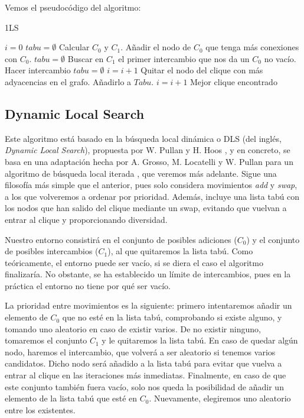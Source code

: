 Vemos el pseudocódigo del algoritmo:

\begin{algorithm}[H]
\caption{1LS}
  \begin{algorithmic}
    \State $i = 0$
    \State $tabu = \emptyset$
    \State Calcular $C_0$ y $C_1$.
    \Repeat
        \State Añadir el nodo de $C_0$ que tenga más conexiones con $C_0$.
        \State $tabu = \emptyset$
      \Else
        \State Buscar en $C_1$ el primer intercambio que nos da un $C_0$ no vacío.
          \State Hacer intercambio
          \State $tabu = \emptyset$
          \State $i = i + 1$
        \Else
          \State Quitar el nodo del clique con más adyacencias en el grafo.
          \State Añadirlo a $Tabu$.
          \State $i = i + 1$
        \EndIf
      \EndIf
    \Return Mejor clique encontrado
    \EndFunction
  \end{algorithmic}
\end{algorithm}

\subsection{Dynamic Local Search}\label{dls}

Este algoritmo está basado en la búsqueda local dinámica o DLS (del inglés, \textit{Dynamic Local Search}),
propuesta por W. Pullan y H. Hoos \citep{pullan:2006}, y en concreto, se basa en una adaptación hecha
por A. Grosso, M. Locatelli y W. Pullan para un algoritmo de búsqueda local iterada \citep{grosso:2008},
que veremos más adelante. Sigue una filosofía más simple que el anterior, pues solo considera movimientos
\textit{add} y \textit{swap}, a los que volveremos a ordenar por prioridad. Además, incluye una
lista tabú con los nodos que han salido del clique mediante un swap, evitando que vuelvan a entrar
al clique y proporcionando diversidad.

Nuestro entorno consistirá en el conjunto de posibles adiciones ($C_0$) y el conjunto de
posibles intercambios ($C_1$), al que quitaremos la lista tabú. Como teóricamente, el entorno
puede ser vacío, si se diera el caso el algoritmo finalizaría. No obstante, se ha establecido
un límite de intercambios, pues en la práctica el entorno no tiene por qué ser vacío.

La prioridad entre movimientos es la siguiente: primero intentaremos añadir un elemento de
$C_0$ que no esté en la lista tabú, comprobando si existe alguno, y tomando uno aleatorio
en caso de existir varios. De no existir ninguno, tomaremos el conjunto $C_1$ y le quitaremos
la lista tabú. En caso de quedar algún nodo, haremos el intercambio, que volverá a ser aleatorio
si tenemos varios candidatos. Dicho nodo será añadido a la lista tabú para evitar que vuelva
a entrar al clique en las iteraciones más inmediatas. Finalmente, en caso de que este conjunto
también fuera vacío, solo nos queda la posibilidad de añadir un elemento de la lista tabú que
esté en $C_0$. Nuevamente, elegiremos uno aleatorio entre los existentes.

